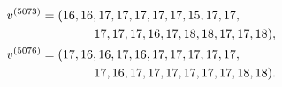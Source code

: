 \begin{equation}\label{eq:frontier-tensors}\begin{aligned}
v^{(5073)}&=(16,16,17,17,17,17,17,15,17,17,\\ &\hspace{15mm}17,17,17,16,17,18,18,17,17,18),\\
v^{(5076)}&=(17,16,16,17,16,17,17,17,17,17,\\ &\hspace{15mm}17,16,17,17,17,17,17,17,18,18).
\end{aligned}\end{equation}
